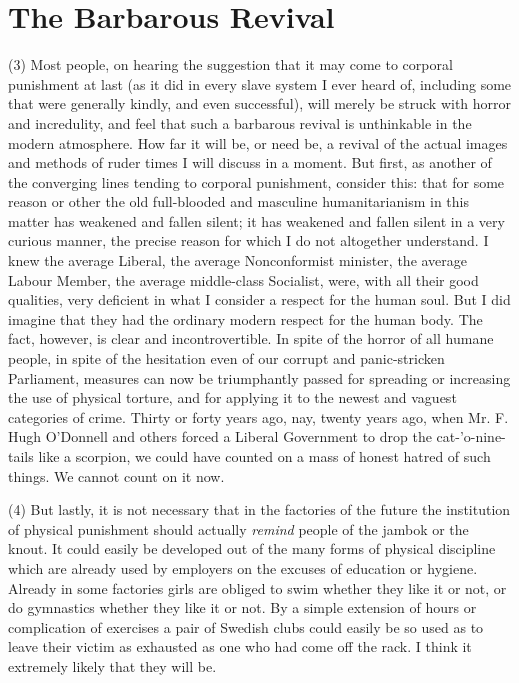 \documentclass{book}
\begin{document}
\section{The Barbarous Revival}
 (3) Most people, on hearing the suggestion that it may come to corporal punishment at last (as it did in every slave system I ever heard of, including some that were generally kindly, and even successful), will merely be struck with horror and incredulity, and feel that such a barbarous revival is unthinkable in the modern atmosphere. How far it will be, or need be, a revival of the actual images and methods of ruder times I will discuss in a moment. But first, as another of the converging lines tending to corporal punishment, consider this: that for some reason or other the old full-blooded and masculine humanitarianism in this matter has weakened and fallen silent; it has weakened and fallen silent in a very curious manner, the precise reason for which I do not altogether understand. I knew the average Liberal, the average Nonconformist minister, the average Labour Member, the average middle-class Socialist, were, with all their good qualities, very deficient in what I consider a respect for the human soul. But I did imagine that they had the ordinary modern respect for the human body. The fact, however, is clear and incontrovertible. In spite of the horror of all humane people, in spite of the hesitation even of our corrupt and panic-stricken Parliament, measures can now be triumphantly passed for spreading or increasing the use of physical torture, and for applying it to the newest and vaguest categories of crime. Thirty or forty years ago, nay, twenty years ago, when Mr. F. Hugh O’Donnell and others forced a Liberal Government to drop the cat-’o-nine-tails like a scorpion, we could have counted on a mass of honest hatred of such things. We cannot count on it now.

(4) But lastly, it is not necessary that in the factories of the future the institution of physical punishment should actually \emph{remind} people of the jambok or the knout. It could easily be developed out of the many forms of physical discipline which are already used by employers on the excuses of education or hygiene. Already in some factories girls are obliged to swim whether they like it or not, or do gymnastics whether they like it or not. By a simple extension of hours or complication of exercises a pair of Swedish clubs could easily be so used as to leave their victim as exhausted as one who had come off the rack. I think it extremely likely that they will be.
\end{document}
